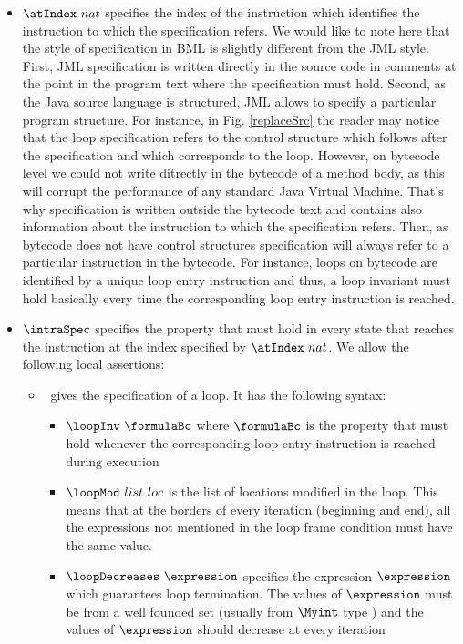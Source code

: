 \begin{itemize}
  \item $\atIndex \ nat$ specifies the index of the instruction which identifies the instruction
        to which the specification refers. We would like to note here that the style of specification in BML
        is slightly different from the JML style. First, JML specification is written directly in the source code in comments
	at the point in the program text where the specification must hold. Second, as the Java source language is structured, JML allows
	to specify a particular program structure. For instance, in Fig. \ref{replaceSrc} the reader may notice that the loop specification
	refers to the control structure which follows after the specification and which corresponds to the loop. However, on bytecode level we
	could not write ditrectly in the bytecode of a method body, as this will corrupt the performance of any standard Java Virtual Machine.
	That's why specification is written outside the bytecode text and contains also information about the instruction to which the specification
	refers. Then, as bytecode does not have control structures specification will always refer to a particular instruction in the bytecode. 
        For instance, loops on bytecode are identified by a unique loop entry instruction and thus, a loop invariant must hold basically every time
	the corresponding loop entry instruction is reached. 
  \item  $\intraSpec$ specifies the property that must hold in  every  state that reaches the instruction at the index  specified by $ \atIndex \ nat$.
         We allow the following local assertions:  
	 
\begin{itemize}
  \item  \loopSpec \ gives the specification of a loop. It has the following syntax: 
          \begin{itemize}
	     \item $\loopInv \  \formulaBc $  where $  \formulaBc $ is   the property that must hold  whenever the corresponding
	           loop entry instruction is reached during execution
             \item $\loopMod \ list \ loc$  is the list of locations modified in the loop. This means that at the borders
	           of every iteration (beginning and end), all the expressions not mentioned in the loop frame condition must have
		   the same value.  
             \item $ \loopDecreases \ \expression $ specifies the expression $\expression $ which guarantees loop termination. 
	           The values of   $\expression $ must be from a well founded set (usually from $\Myint$ type ) and the values
		    of   $\expression $ should decrease at every iteration 
            \end{itemize}


\end{itemize}
\end{itemize}
